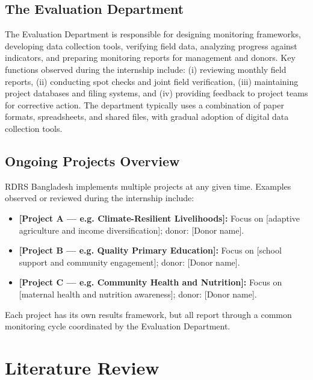 \documentclass[12pt,a4paper]{report}
\begin{document}
\section{The Evaluation Department}
The Evaluation Department is responsible for designing monitoring
frameworks, developing data collection tools, verifying field data,
analyzing progress against indicators, and preparing monitoring reports
for management and donors. Key functions observed during the internship
include: (i) reviewing monthly field reports, (ii) conducting spot
checks and joint field verification, (iii) maintaining project
databases and filing systems, and (iv) providing feedback to project
teams for corrective action. The department typically uses a combination
of paper formats, spreadsheets, and shared files, with gradual adoption
of digital data collection tools.

\section{Ongoing Projects Overview}
RDRS Bangladesh implements multiple projects at any given time. Examples
observed or reviewed during the internship include:
\begin{itemize}
    \item \textbf{[Project A --- e.g. Climate-Resilient Livelihoods]:}
        Focus on [adaptive agriculture and income diversification];
        donor: [Donor name]. %
    \item \textbf{[Project B --- e.g. Quality Primary Education]:}
        Focus on [school support and community engagement];
        donor: [Donor name]. %
    \item \textbf{[Project C --- e.g. Community Health and Nutrition]:}
        Focus on [maternal health and nutrition awareness];
        donor: [Donor name]. %
\end{itemize}
Each project has its own results framework, but all report through a
common monitoring cycle coordinated by the Evaluation Department.

\chapter{Literature Review}
\end{document}
